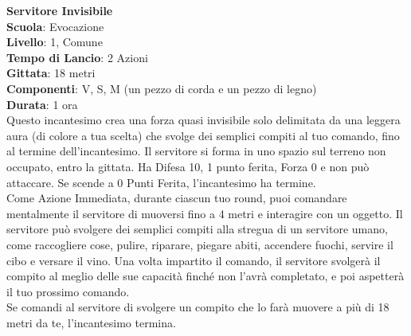 \begin{multicols}{2}
\medskip\textbf{Servitore Invisibile}\\
\textbf{Scuola}: Evocazione\\
\textbf{Livello}: 1, Comune\\
\textbf{Tempo di Lancio}: 2 Azioni\\
\textbf{Gittata}: 18 metri\\
\textbf{Componenti}: V, S, M (un pezzo di corda e un pezzo di legno)\\
\textbf{Durata}: 1 ora\\
Questo incantesimo crea una forza quasi invisibile solo delimitata da una leggera aura (di colore a tua scelta) che svolge dei semplici compiti al tuo comando, fino al termine dell'incantesimo. Il servitore si forma in uno spazio sul terreno non occupato, entro la gittata. Ha Difesa 10, 1 punto ferita, Forza 0 e non può attaccare. Se scende a 0 Punti Ferita, l'incantesimo ha termine.\\
Come Azione Immediata, durante ciascun tuo round, puoi comandare mentalmente il servitore di muoversi fino a 4 metri e interagire con un oggetto. Il servitore può svolgere dei semplici compiti alla stregua di un servitore umano, come raccogliere cose, pulire, riparare, piegare abiti, accendere fuochi, servire il cibo e versare il vino. Una volta impartito il comando, il servitore svolgerà il compito al meglio delle sue capacità finché non l'avrà completato, e poi aspetterà il tuo prossimo comando. \\
Se comandi al servitore di svolgere un compito che lo farà muovere a più di 18 metri da te, l'incantesimo termina.


\end{multicols}

